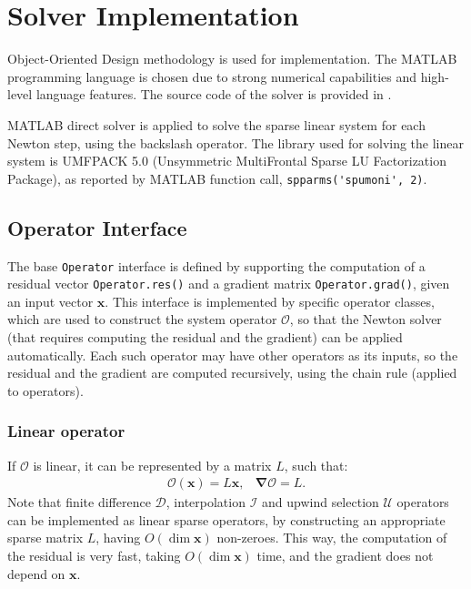 \documentclass[MSc,beforeExam]{iitcsthesis}
\newcommand\bnabla{\boldsymbol{\nabla}}
\newcommand\bx{\boldsymbol{x}}
\newcommand\cO{\mathcal{O}}
\newcommand\cI{\mathcal{I}}
\newcommand\cD{\mathcal{D}}
\begin{document}
\section{Solver Implementation}

Object-Oriented Design methodology is used for implementation.
The MATLAB programming language is chosen due to strong numerical capabilities
and high-level language features.
The source code of the solver is provided in \cite{source}.

MATLAB direct solver is applied to solve the sparse linear system for each Newton step,
using the backslash operator. 
The library used for solving the linear system is UMFPACK 5.0 \cite{davis2004umfpack}
(Unsymmetric MultiFrontal Sparse LU Factorization Package),
as reported by MATLAB function call, \verb|spparms('spumoni', 2)|. 

\subsection{Operator Interface} \label{sec:operator-interface}
The base \verb|Operator| interface is defined by 
supporting the computation of a residual vector \verb|Operator.res()|
and a gradient matrix \verb|Operator.grad()|, given an input vector $\bx$.
This interface is implemented by specific operator classes,
which are used to construct the system operator $\cO$, so that 
the Newton solver (that requires computing the residual and the gradient) 
can be applied automatically.
Each such operator may have other operators as its inputs, so the residual
and the gradient are computed recursively, using the chain rule (applied to operators).

\subsubsection{Linear operator}
If $\cO$ is linear, it can be represented by a matrix $L$, such that:
\begin{equation}\begin{array}{cc}
\cO(\bx) = L \bx, &
\bnabla\cO = L. 
\end{array}\end{equation}
Note that finite difference $\cD$, interpolation $\cI$ and 
upwind selection $\mathcal{U}$ operators
can be implemented as linear sparse operators, by constructing 
an appropriate sparse matrix $L$, having $O(\dim \bx)$ non-zeroes.
This way, the computation of the residual is very fast, taking $O(\dim \bx)$ time,
and the gradient does not depend on $\bx$.
\end{document}
